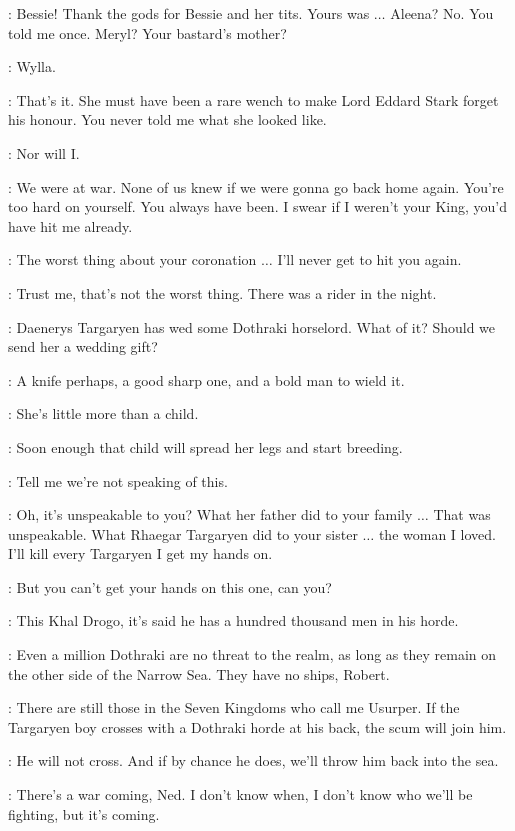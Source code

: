 \ROBERT: Bessie! Thank the gods for Bessie and her tits. Yours was $\ldots$ Aleena? No. You told me once. Meryl? Your bastard's mother? 

\NED: Wylla. 

\ROBERT: That's it. She must have been a rare wench to make Lord Eddard Stark forget his honour. You never told me what she looked like. 

\NED: Nor will I. 

\ROBERT: We were at war. None of us knew if we were gonna go back home again. You're too hard on yourself. You always have been. I swear if I weren't your King, you'd have hit me already. 

\NED: The worst thing about your coronation $\ldots$ I'll never get to hit you again. 

\ROBERT: Trust me, that's not the worst thing. There was a rider in the night. 

\NED: Daenerys Targaryen has wed some Dothraki horselord. What of it? Should we send her a wedding gift? 

\ROBERT: A knife perhaps, a good sharp one, and a bold man to wield it. 

\NED: She's little more than a child. 

\ROBERT: Soon enough that child will spread her legs and start breeding. 

\NED: Tell me we're not speaking of this. 

\ROBERT: Oh, it's unspeakable to you? What her father did to your family $\ldots$ That was unspeakable. What Rhaegar Targaryen did to your sister $\ldots$ the woman I loved. I'll kill every Targaryen I get my hands on. 

\NED: But you can't get your hands on this one, can you? 

\ROBERT: This Khal Drogo, it's said he has a hundred thousand men in his horde. 

\NED: Even a million Dothraki are no threat to the realm, as long as they remain on the other side of the Narrow Sea. They have no ships, Robert. 

\ROBERT: There are still those in the Seven Kingdoms who call me Usurper. If the Targaryen boy crosses with a Dothraki horde at his back, the scum will join him. 

\NED: He will not cross. And if by chance he does, we'll throw him back into the sea. 

\ROBERT: There's a war coming, Ned. I don't know when, I don't know who we'll be fighting, but it's coming. 

